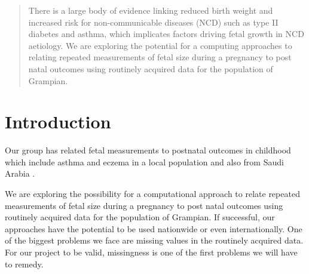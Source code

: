 \documentclass[a0,portrait]{a0poster}
\begin{document}
\vspace{1cm} %


\begin{multicols}{2} %


\color{Navy} %

\begin{abstract}
There is a large body of evidence linking reduced birth weight and increased risk for non-communicable diseases (NCD) such as type II diabetes and asthma, which implicates factors driving fetal growth in NCD aetiology. We are exploring the potential for a computing approaches to relating repeated measurements of fetal size during a pregnancy to post natal outcomes using routinely acquired data for the population of Grampian.
\end{abstract}


\color{SaddleBrown} %

\section*{Introduction}
Our group has related fetal measurements to postnatal outcomes in childhood which include asthma and eczema in a local population \cite{turner1, turner2, turner3} and also from Saudi Arabia \cite{ saudi}.

We are exploring the possibility for a computational approach to relate repeated measurements of fetal size during a pregnancy to post natal outcomes using routinely acquired data for the population of Grampian. If successful, our approaches have the potential to be used nationwide or even internationally. 
One of the biggest problems we face are missing values in the routinely acquired data. For our project to be valid, missingness is one of the first problems we will have to remedy.


\end{multicols}
\end{document}

